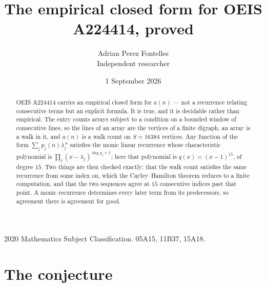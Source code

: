 \documentclass[11pt,a4paper]{article}
\title{The empirical closed form for OEIS A224414, proved}
\author{Adrian Perez Fontelles\\ \small Independent researcher}
\date{1 September 2026}
\theoremstyle{plain}
\theoremstyle{definition}
\begin{document}
\maketitle

\begin{abstract}
OEIS A224414 carries an empirical closed form for $a(n)$ --- not a recurrence relating
consecutive terms but an explicit formula. It is true, and it is decidable rather than
empirical. The entry counts arrays subject to a condition on a bounded window of consecutive lines, so the lines of an array are the
vertices of a finite digraph, an array is a walk in it, and $a(n)$ is a walk count on
$S=16384$ vertices. Any function of the form $\sum_j p_j(n)\lambda_j^{\,n}$ satisfies the
monic linear recurrence whose characteristic polynomial is
$\prod_j(x-\lambda_j)^{\deg p_j+1}$; here that polynomial is $q(x)=(x-1)^{15}$, of degree
$15$. Two things are then checked exactly: that the walk count satisfies the same
recurrence from some index on, which the Cayley--Hamilton theorem reduces to a finite
computation, and that the two sequences agree at $15$ consecutive indices past that
point. A monic recurrence determines every later term from its predecessors, so agreement
there is agreement for good.
\end{abstract}

\noindent\small 2020 Mathematics Subject Classification. 05A15, 11B37, 15A18.\normalsize

\section{The conjecture}
\end{document}

